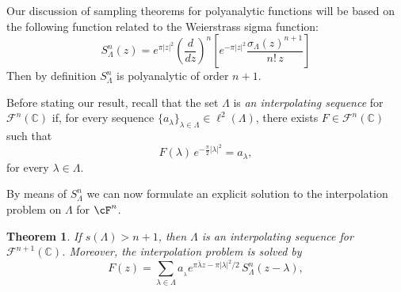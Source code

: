 \documentclass[12pt]{amsart}
\newtheorem{theorem}{Theorem}
\theoremstyle{plain}
\numberwithin{equation}{section}
\begin{document}
Our discussion of sampling theorems for polyanalytic functions will be based
on the following function related to the Weierstrass sigma function: 
\begin{equation}  \label{intexp}
S_{\Lambda }^n(z)=e^{\pi \left\vert z\right\vert ^{2}}\left( \frac{d}{dz}%
\right) ^{n}\left[ e^{-\pi \left\vert z\right\vert ^{2}}\frac{ \sigma
_{\Lambda }(z) ^{n+1}}{n! \, z}\right]
\end{equation}%
Then by definition $S^n_\Lambda $ is polyanalytic of order $n+1$.

Before stating our result, recall that the set $\Lambda $ is \emph{an
interpolating sequence} for $\mathcal{F}^{n}(%
\mathbb{C}
)$ if, for every sequence $\{a_{\lambda }\}_{\lambda \in \Lambda }\in \ell
^{2}(\Lambda )$, there exists $F\in \mathcal{F}^{n}(%
\mathbb{C}
)$ such that 
\begin{equation*}
F(\lambda )\, e^{-\frac{\pi }{2}\left\vert \lambda \right\vert ^{2}} =a
_{\lambda },
\end{equation*}%
for every $\lambda \in \Lambda .$\ 

By means of $S^n_\Lambda $ we can now formulate an explicit solution to the
interpolation problem on $\Lambda $ for $\cF ^n$.

\begin{theorem}
\label{th1} If $s(\Lambda )>n+1$, then $\Lambda $ is an interpolating
sequence for $\mathcal{F}^{n+1}(%
\mathbb{C}
)$. Moreover, the interpolation problem is solved by 
\begin{equation}
F(z)=\sum_{\lambda \in \Lambda }a_{_{\lambda }}e^{\pi \overline{\lambda }%
z-\pi \left\vert \lambda \right\vert ^{2}/2} \, S^n_{\Lambda }(z-\lambda ) ,
\label{series}
\end{equation}
\end{theorem}
\end{document}
